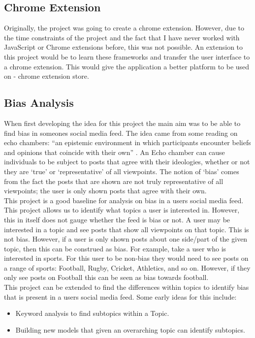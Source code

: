 \subsection{Chrome Extension}
Originally, the project was going to create a chrome extension. However, due to the time constraints of the project and the fact that I have never worked
with JavaScript or Chrome extensions before, this was not possible. An extension to this project would be to learn these frameworks and transfer the
user interface to a chrome extension. This would give the application a better platform to be used on - chrome extension store.
\subsection{Bias Analysis}
When first developing the idea for this project the main aim was to be able to find bias in someones social media feed. The idea came from some reading
on echo chambers: ``an epistemic environment in which participants encounter beliefs and opinions that coincide with their own'' \cite{echo-chambers}.
An Echo chamber can cause individuals to be subject to posts that agree with their ideologies, whether or not they are `true' or `representative' of all viewpoints.
The notion of `bias' comes from the fact the posts that are shown are not truly representative of all viewpoints; the user is only shown posts that agree with their own.\\
This project is a good baseline for analysis on bias in a users social media feed. This project allows us to identify what topics a user is interested in. However, this
in itself does not gauge whether the feed is bias or not. A user may be interested in a topic and see posts that show all viewpoints on that topic. This is not bias.
However, if a user is only shown posts about one side/part of the given topic, then this can be construed as bias. For example, take a user who is interested in sports.
For this user to be non-bias they would need to see posts on a range of sports: Football, Rugby, Cricket, Athletics, and so on. However, if they only see posts on Football
this can be seen as bias towards football.\\
This project can be extended to find the differences within topics to identify bias that is present in a users social media feed. Some early ideas for this include:
\begin{itemize}
    \item Keyword analysis to find subtopics within a Topic.
    \item Building new models that given an overarching topic can identify subtopics.
\end{itemize}